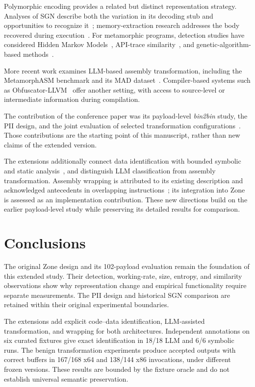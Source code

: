 \documentclass[runningheads]{llncs}
\begin{document}
Polymorphic encoding provides a related but distinct representation strategy. Analyses of SGN describe both the variation in its decoding stub and opportunities to recognize it~\cite{sgn64,sgnstrong}; memory-extraction research addresses the body recovered during execution~\cite{codeExtraction}. For metamorphic programs, detection studies have considered Hidden Markov Models~\cite{wong2006hunting,desai2010highly}, API-trace similarity~\cite{identifyingmeth}, and genetic-algorithm-based methods~\cite{methgenetic}.

More recent work examines LLM-based assembly transformation, including the MetamorphASM benchmark and its MAD dataset~\cite{llmobf,llm2}. Compiler-based systems such as Obfuscator-LLVM~\cite{llvmobf} offer another setting, with access to source-level or intermediate information during compilation.

The contribution of the conference paper was its payload-level \emph{bin2bin} study, the PII design, and the joint evaluation of selected transformation configurations~\cite{zone_secrypt_2026}. Those contributions are the starting point of this manuscript, rather than new claims of the extended version.


The extensions additionally connect data identification with bounded
symbolic and static analysis~\cite{angr_cfg_docs}, and distinguish LLM
classification from assembly transformation. Assembly wrapping is
attributed to its existing description and acknowledged antecedents
in overlapping instructions~\cite{assembly_wrapping}; its integration
into Zone is assessed as an implementation contribution. These new
directions build on the earlier payload-level study while preserving
its detailed results for comparison.

\section{Conclusions}\label{sec:conclusion3}
The original Zone design and its 102-payload evaluation remain the
foundation of this extended study. Their detection, working-rate,
size, entropy, and similarity observations show why representation
change and empirical functionality require separate measurements.
The PII design and historical SGN comparison are retained within
their original experimental boundaries.

The extensions add explicit code--data identification, LLM-assisted
transformation, and wrapping for both architectures. Independent
annotations on six curated fixtures give exact identification in
18/18 LLM and 6/6 symbolic runs. The benign transformation experiments
produce accepted outputs with correct buffers in 167/168 x64 and
138/144 x86 invocations, under different frozen versions. These
results are bounded by the fixture oracle and do not establish
universal semantic preservation.
\end{document}
